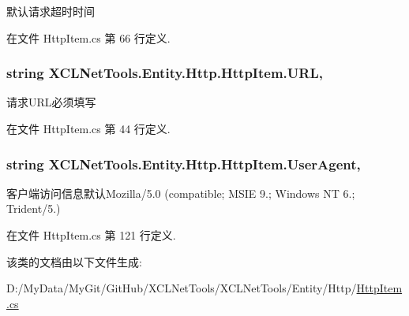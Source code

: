 默认请求超时时间 



在文件 Http\-Item.\-cs 第 66 行定义.

\hypertarget{class_x_c_l_net_tools_1_1_entity_1_1_http_1_1_http_item_aaaa3a229c51a9c1dab14f61c0104b380}{
\subsubsection[{U\-R\-L}]{\setlength{\rightskip}{0pt plus 5cm}string X\-C\-L\-Net\-Tools.\-Entity.\-Http.\-Http\-Item.\-U\-R\-L\hspace{0.3cm}{\ttfamily [get]}, {\ttfamily [set]}}}\label{class_x_c_l_net_tools_1_1_entity_1_1_http_1_1_http_item_aaaa3a229c51a9c1dab14f61c0104b380}


请求\-U\-R\-L必须填写 



在文件 Http\-Item.\-cs 第 44 行定义.

\hypertarget{class_x_c_l_net_tools_1_1_entity_1_1_http_1_1_http_item_af781edd22001f482ae8090b6cbee1cdb}{
\subsubsection[{User\-Agent}]{\setlength{\rightskip}{0pt plus 5cm}string X\-C\-L\-Net\-Tools.\-Entity.\-Http.\-Http\-Item.\-User\-Agent\hspace{0.3cm}{\ttfamily [get]}, {\ttfamily [set]}}}\label{class_x_c_l_net_tools_1_1_entity_1_1_http_1_1_http_item_af781edd22001f482ae8090b6cbee1cdb}


客户端访问信息默认\-Mozilla/5.0 (compatible; M\-S\-I\-E 9.; Windows N\-T 6.; Trident/5.) 



在文件 Http\-Item.\-cs 第 121 行定义.



该类的文档由以下文件生成\-:\begin{DoxyCompactItemize}
\item 
D\-:/\-My\-Data/\-My\-Git/\-Git\-Hub/\-X\-C\-L\-Net\-Tools/\-X\-C\-L\-Net\-Tools/\-Entity/\-Http/\hyperlink{_http_item_8cs}{Http\-Item.\-cs}\end{DoxyCompactItemize}
